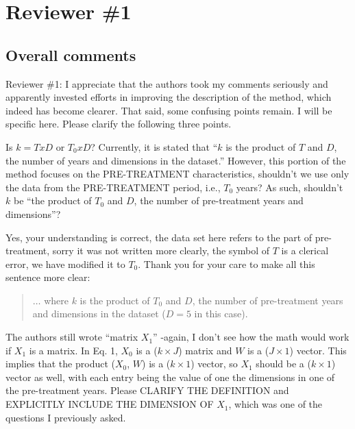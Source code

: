 \section{Reviewer \#1}\label{reviewer_1}

\subsection*{Overall comments}

Reviewer \#1: I appreciate that the authors took my comments seriously and apparently invested efforts in improving the description of the method, which indeed has become clearer. That said, some confusing points remain. I will be specific here. Please clarify the following three points.

\RC{} Is $k = T x D$ or $T_0 x D$? Currently, it is stated that ``$k$ is the product of $T$ and $D$, the number of years and dimensions in the dataset.'' However, this portion of the method focuses on the PRE-TREATMENT characteristics, shouldn't we use only the data from the PRE-TREATMENT period, i.e., $T_0$ years? As such, shouldn't $k$ be ``the product of $T_0$ and $D$, the number of pre-treatment years and dimensions''?

\AR{} Yes, your understanding is correct, the data set here refers to the part of pre-treatment, sorry it was not written more clearly, the symbol of $T$ is a clerical error, we have modified it to $T_0$. Thank you for your care to make all this sentence more clear:

\begin{quote}
    $\dots$ where $k$ is the product of $T_0$ and $D$, the number of pre-treatment years and dimensions in the dataset ($D = 5$ in this case).
\end{quote}

\RC{} The authors still wrote ``matrix $X_1$'' -again, I don't see how the math would work if $X_1$ is a matrix. In Eq. 1, $X_0$ is a ($k \times J$) matrix and $W$ is a ($J \times 1$) vector. This implies that the product ($X_0$, $W$) is a ($k \times 1$) vector, so $X_1$ should be a ($k \times 1$) vector as well, with each entry being the value of one the dimensions in one of the pre-treatment years. Please CLARIFY THE DEFINITION and EXPLICITLY INCLUDE THE DIMENSION OF $X_1$, which was one of the questions I previously asked.

